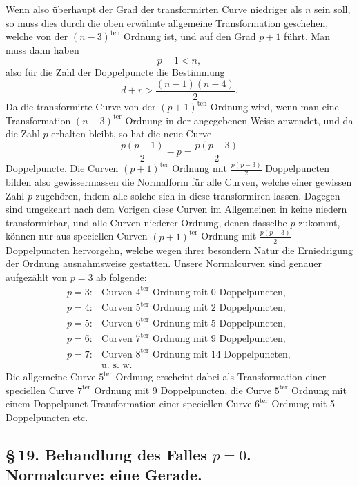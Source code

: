 \documentclass[10pt]{article}
\begin{document}
Wenn also überhaupt der Grad der transformirten Curve niedriger als \(n\) sein soll, so muss dies durch die oben erwähnte allgemeine Transformation geschehen, welche von der \((n-3)^{\text{ten}}\) Ordnung ist, und auf den Grad \(p+1\) führt. Man muss dann haben
\[
p+1<n,
\]
also für die Zahl der Doppelpuncte die Bestimmung
\[
d+r>\frac{(n-1)(n-4)}{2}.
\]
Da die transformirte Curve von der \((p+1)^{\text{ten}}\) Ordnung wird, wenn man eine Transformation \((n-3)^{\text{ter}}\) Ordnung in der angegebenen Weise anwendet, und da die Zahl \(p\) erhalten bleibt, so hat die neue Curve
\[
\frac{p(p-1)}{2}-p=\frac{p(p-3)}{2}
\]
Doppelpuncte. Die Curven \((p+1)^{\text{ter}}\) Ordnung mit \(\frac{p(p-3)}{2}\) Doppelpuncten bilden also gewissermassen die Normalform für alle Curven, welche einer gewissen Zahl \(p\) zugehören, indem alle solche sich in diese transformiren lassen. Dagegen sind umgekehrt nach dem Vorigen diese Curven im Allgemeinen in keine niedern transformirbar, und alle Curven niederer Ordnung, denen dasselbe \(p\) zukommt, können nur aus speciellen Curven \((p+1)^{\text{ter}}\) Ordnung mit \(\frac{p(p-3)}{2}\) Doppelpuncten hervorgehn, welche wegen ihrer besondern Natur die Erniedrigung der Ordnung ausnahmsweise gestatten. Unsere Normalcurven sind genauer aufgezählt von \(p=3\) ab folgende:
\[
\begin{array}{ll}
p=3:& \text{Curven }4^{\text{ter}}\text{ Ordnung mit }0\text{ Doppelpuncten},\\
p=4:& \text{Curven }5^{\text{ter}}\text{ Ordnung mit }2\text{ Doppelpuncten},\\
p=5:& \text{Curven }6^{\text{ter}}\text{ Ordnung mit }5\text{ Doppelpuncten},\\
p=6:& \text{Curven }7^{\text{ter}}\text{ Ordnung mit }9\text{ Doppelpuncten},\\
p=7:& \text{Curven }8^{\text{ter}}\text{ Ordnung mit }14\text{ Doppelpuncten},\\
&\text{u. s. w.}
\end{array}
\]
Die allgemeine Curve \(5^{\text{ter}}\) Ordnung erscheint dabei als Transformation einer speciellen Curve \(7^{\text{ter}}\) Ordnung mit 9 Doppelpuncten, die Curve \(5^{\text{ter}}\) Ordnung mit einem Doppelpunct Transformation einer speciellen Curve \(6^{\text{ter}}\) Ordnung mit 5 Doppelpuncten etc.


\subsection*{\S\,19. Behandlung des Falles \(p=0\). Normalcurve: eine Gerade.}
\end{document}
